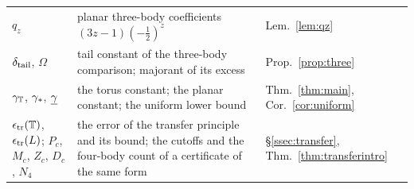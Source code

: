 \begin{longtable}{@{}>{\raggedright\arraybackslash}p{}>{\raggedright\arraybackslash}p{}>{\raggedright\arraybackslash}p{}@{}}
$q_z$ & planar three-body coefficients $(3z-1)(-\frac12)^z$ & Lem.~\ref{lem:qz}\\
$\delta_{\mathrm{tail}}$, $\Omega$ & tail constant of the three-body comparison; majorant of its excess & Prop.~\ref{prop:three}\\
$\gamma_{\mathbb{T}}$, $\gamma_{*}$, $\underline{\gamma}$ & the torus constant; the planar constant; the uniform lower bound
& Thm.~\ref{thm:main}, Cor.~\ref{cor:uniform}\\
$\epsilon_{\mathrm{tr}}(\mathbb{T})$, $\epsilon_{\mathrm{tr}}(L)$; $P_c$, $M_c$, $Z_c$, $D_c$, $N_4$ & the error of the transfer principle and its bound; the
cutoffs and the four-body count of a certificate of the same form & \S\ref{ssec:transfer}, Thm.~\ref{thm:transferintro}\\
\end{longtable}
\endgroup
